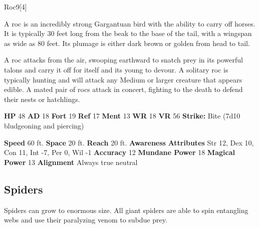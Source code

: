   
  \begin{monsection}{Roc}{9}[4]
    \vspace{-1em}\vspace{-1em}
    \vspace{0em}

    
        A roc is an incredibly strong Gargantuan bird with the ability to carry off horses.
        It is typically 30 feet long from the beak to the base of the tail, with a wingspan as wide as 80 feet.
        Its plumage is either dark brown or golden from head to tail.
      
        A roc attacks from the air, swooping earthward to snatch prey in its powerful talons and carry it off for itself and its young to devour.
        A solitary roc is typically hunting and will attack any Medium or larger creature that appears edible.
        A mated pair of rocs attack in concert, fighting to the death to defend their nests or hatchlings.
      

    \begin{spellcontent}
      \begin{spelltargetinginfo}
        \pari \textbf{HP} 48 \monsep
          \textbf{AD} 18 \monsep
          \textbf{Fort} 19 \monsep
          \textbf{Ref} 17 \monsep
          \textbf{Ment} 13
        \pari \textbf{WR} 18 \monsep
        \textbf{VR} 56
        \pari \textbf{Strike:}
            Bite  (7d10 bludgeoning and piercing)
      \end{spelltargetinginfo}
    \end{spellcontent}
    \begin{monsterfooter}
      \pari \textbf{Speed} 60 ft. \monsep
        \textbf{Space} 20 ft. \monsep
        \textbf{Reach} 20 ft.
      \pari \textbf{Awareness} 
      \pari \textbf{Attributes}
        Str 12, Dex 10,
        Con 11, Int -7,
        Per 0, Wil -1
      \pari \textbf{Accuracy} 12 \monsep
        \textbf{Mundane Power} 18 \monsep
      \textbf{Magical Power} 13
      \pari \textbf{Alignment} Always true neutral
    \end{monsterfooter}
  \end{monsection}
  
  
    \subsection{Spiders}
      
      Spiders can grow to enormous size.
      All giant spiders are able to spin entangling webs and use their paralyzing venom to subdue prey.
    
